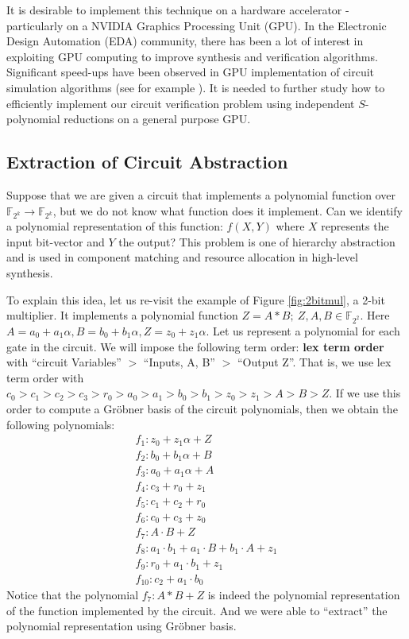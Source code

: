 {{It is desirable to implement this technique on a hardware accelerator -
particularly on a NVIDIA Graphics Processing Unit (GPU). In the
Electronic Design Automation (EDA) community, there has been a lot of
interest in exploiting GPU computing to improve synthesis and
verification algorithms. Significant speed-ups have
been observed in GPU implementation of circuit simulation algorithms
(see for example \cite{PengLi:GPU}). It is needed to further study how to
efficiently implement our circuit verification problem using
independent $S$-polynomial reductions on a general purpose GPU. 

\subsection{Extraction of Circuit Abstraction}

Suppose that we are given a circuit that implements a polynomial
function over $\mathbb{F}_{2^{k}} \rightarrow \mathbb{F}_{2^{k}}$, 
but we do not know what function does it implement. 
Can we identify a polynomial representation of this
function: $f(X, Y)$ where $X$ represents the input bit-vector and $Y$
the output? This problem is one of hierarchy abstraction and is used
in component matching and resource allocation in high-level synthesis. 

To explain this idea, let us re-visit the example of
Figure \ref{fig:2bitmul}, a 2-bit multiplier. It implements a polynomial
function $Z = A * B; ~Z, A, B  \in {\mathbb{F}}_{2^2}$. Here $A= a_0 +
a_1\alpha, B = b_0 + b_1 \alpha, Z = z_0 + z_1\alpha$. Let us
represent a polynomial for each gate in the circuit. We will impose
the following term order: {\bf lex term order} with ``circuit
Variables'' $>$ ``Inputs, A, B'' $>$ ``Output Z''. That is, we use lex
term order with $c_0 > c_1 >  c_2 >  c_3 >  r_0 > a_0 > 
a_1 > b_0 > b_1 > z_0 > z_1 > A > B > Z$. If we use this order to compute a Gr\"obner basis of the circuit
polynomials, then we obtain the following polynomials: 
\begin{eqnarray}
f_1: z_0+z_1\alpha +Z  \nonumber \\
f_2: b_0+b_1\alpha +B  \nonumber \\
f_3: a_0+a_1\alpha +A \nonumber \\
f_4: c_3+r_0+z_1  \nonumber \\
f_5: c_1+c_2+r_0  \nonumber \\
f_6: c_0+c_3+z_0  \nonumber \\
f_7:  A\cdot B+Z 		 \nonumber \\
f_8: a_1\cdot b_1+a_1\cdot B+b_1\cdot A+z_1  \nonumber \\
f_9: r_0+a_1\cdot b_1+z_1 		 \nonumber \\
f_{10}: c_2+a_1\cdot b_0  \nonumber 
\end{eqnarray}
Notice that the polynomial $f_7: A*B + Z$ is indeed the polynomial representation of the
function implemented by the circuit. And we were able to ``extract''
the polynomial representation using Gr\"obner basis. 

}}
